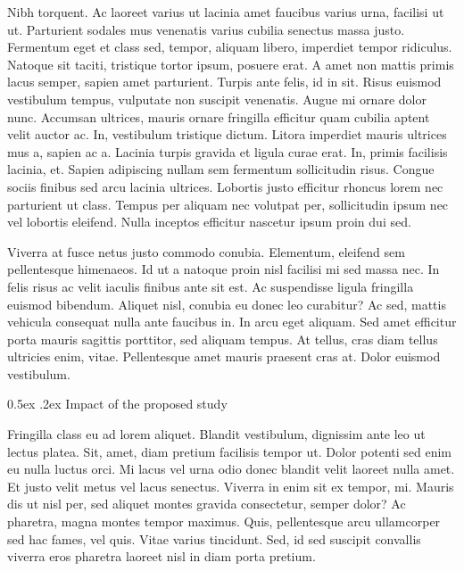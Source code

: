 \documentclass[11pt,]{article}
\makeatletter
\renewcommand\subsubsection{
  \@startsection{subsubsection}{3}{\z@}
    {-1.0ex\@plus -1ex \@minus -.2ex}%
    {0.5ex \@plus .2ex}%
    {\normalfont\normalsize\bf}} %
\makeatother
\begin{document}
Nibh torquent. Ac laoreet varius ut lacinia amet faucibus varius urna,
facilisi ut ut. Parturient sodales mus venenatis varius cubilia senectus
massa justo. Fermentum eget et class sed, tempor, aliquam libero,
imperdiet tempor ridiculus. Natoque sit taciti, tristique tortor ipsum,
posuere erat. A amet non mattis primis lacus semper, sapien amet
parturient. Turpis ante felis, id in sit. Risus euismod vestibulum
tempus, vulputate non suscipit venenatis. Augue mi ornare dolor nunc.
Accumsan ultrices, mauris ornare fringilla efficitur quam cubilia aptent
velit auctor ac. In, vestibulum tristique dictum. Litora imperdiet
mauris ultrices mus a, sapien ac a. Lacinia turpis gravida et ligula
curae erat. In, primis facilisis lacinia, et. Sapien adipiscing nullam
sem fermentum sollicitudin risus. Congue sociis finibus sed arcu lacinia
ultrices. Lobortis justo efficitur rhoncus lorem nec parturient ut
class. Tempus per aliquam nec volutpat per, sollicitudin ipsum nec vel
lobortis eleifend. Nulla inceptos efficitur nascetur ipsum proin dui
sed.

Viverra at fusce netus justo commodo conubia. Elementum, eleifend sem
pellentesque himenaeos. Id ut a natoque proin nisl facilisi mi sed massa
nec. In felis risus ac velit iaculis finibus ante sit est. Ac
suspendisse ligula fringilla euismod bibendum. Aliquet nisl, conubia eu
donec leo curabitur? Ac sed, mattis vehicula consequat nulla ante
faucibus in. In arcu eget aliquam. Sed amet efficitur porta mauris
sagittis porttitor, sed aliquam tempus. At tellus, cras diam tellus
ultricies enim, vitae. Pellentesque amet mauris praesent cras at. Dolor
euismod vestibulum.

\hypertarget{impact-of-the-proposed-study}{%
\subsubsection{Impact of the proposed
study}\label{impact-of-the-proposed-study}}

Fringilla class eu ad lorem aliquet. Blandit vestibulum, dignissim ante
leo ut lectus platea. Sit, amet, diam pretium facilisis tempor ut. Dolor
potenti sed enim eu nulla luctus orci. Mi lacus vel urna odio donec
blandit velit laoreet nulla amet. Et justo velit metus vel lacus
senectus. Viverra in enim sit ex tempor, mi. Mauris dis ut nisl per, sed
aliquet montes gravida consectetur, semper dolor? Ac pharetra, magna
montes tempor maximus. Quis, pellentesque arcu ullamcorper sed hac
fames, vel quis. Vitae varius tincidunt. Sed, id sed suscipit convallis
viverra eros pharetra laoreet nisl in diam porta pretium.


\end{document}
